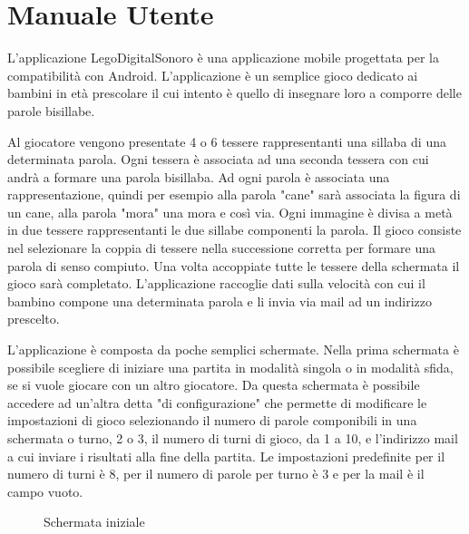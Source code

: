 \renewcommand*{\mypath}{legodigitalsonoro1}%
\graphicspath{{\mypath/images/}}


\newcommand{\includefigure}[2]{
\begin{figure}[h!]
\centering{
\texttt{[image: \#1.png]}}
\caption{#2}
\label{fig:#1}
\end{figure}
}

\section{Manuale Utente}

L'applicazione LegoDigitalSonoro è una applicazione mobile progettata per la compatibilità con Android. L'applicazione è un semplice gioco dedicato ai bambini in età prescolare il cui intento è quello di insegnare loro a comporre delle parole bisillabe.

Al giocatore vengono presentate 4 o 6 tessere rappresentanti una sillaba di una determinata parola. Ogni tessera è associata ad una seconda tessera con cui andrà a formare una parola bisillaba. Ad ogni parola è associata una rappresentazione, quindi per esempio alla parola "cane" sarà associata la figura di un cane, alla parola "mora" una mora e così via. Ogni immagine è divisa a metà in due tessere rappresentanti le due sillabe componenti la parola. Il gioco consiste nel selezionare la coppia di tessere nella successione corretta per formare una parola di senso compiuto. Una volta accoppiate tutte le tessere della schermata il gioco sarà completato. L'applicazione raccoglie dati sulla velocità con cui il bambino compone una determinata parola e li invia via mail ad un indirizzo prescelto.

L'applicazione è composta da poche semplici schermate. Nella prima schermata è possibile scegliere di iniziare una partita in modalità singola o in modalità sfida, se si vuole giocare con un altro giocatore. Da questa schermata è possibile accedere ad un'altra detta "di configurazione" che permette di modificare le impostazioni di gioco selezionando il numero di parole componibili in una schermata o turno, 2 o 3, il numero di turni di gioco, da 1 a 10, e l'indirizzo mail a cui inviare i risultati alla fine della partita. Le impostazioni predefinite per il numero di turni è 8, per il numero di parole per turno è 3 e per la mail è il campo vuoto.

\includefigure{main}{Schermata iniziale}

